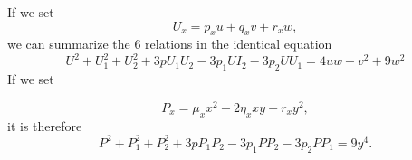 \documentclass[12pt]{article}
\begin{document}
If we set
\begin{equation*}
U_{x}=p_{x} u+q_{x} v+r_{x} w,
\end{equation*}
we can summarize the 6 relations in the identical equation
\begin{equation*}
U^{2}+U_{1}^{2}+U_{2}^{2}+3 p U_{1} U_{2}-3 p_{1} U I_{2}-3 p_{2} U U_{1}=4 u w-v^{2}+9 w^{2}  \tag{6.}
\end{equation*}
If we set

\begin{equation*}
P_{x}=\mu_{x} x^{2}-2 \eta_{x} x y+r_{x} y^{2} , \tag{7.}
\end{equation*}
it is therefore
\begin{equation*}
P^{2}+P_{1}^{2}+P_{2}^{2}+3 p P_{1} P_{2}-3 p_{1} P P_{2}-3 p_{2} P P_{1}=9 y^{4} . \tag{8.}
\end{equation*}
\end{document}
